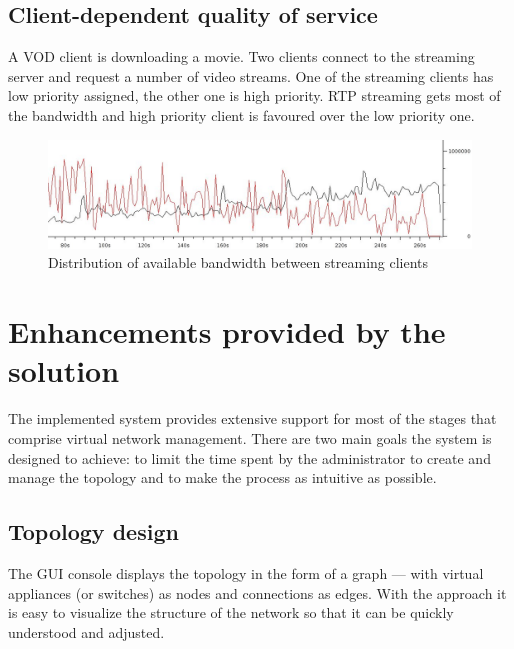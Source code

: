 \documentclass[11pt]{book}
\begin{document}
      \subsection{Client-dependent quality of service}
      \label{sub:uc:client}

        A VOD client is downloading a movie. Two clients connect to the streaming server and request a number of video
        streams. One of the streaming clients has low priority assigned, the other one is high priority. RTP streaming
        gets most of the bandwidth and high priority client is favoured over the low priority one.

        \begin{figure}[H]
          \begin{center}
            \includegraphics[width=.7\textwidth]{img/test-case/exp-stream-client.png}
          \end{center}

          \caption{Distribution of available bandwidth between streaming clients}
        \end{figure}


    \section{Enhancements provided by the solution}
    \label{sec:uc:enhance}

      The implemented system provides extensive support for most of the stages that comprise virtual network management.
      There are two main goals the system is designed to achieve: to limit the time spent by the administrator to create
      and manage the topology and to make the process as intuitive as possible.


      \subsection{Topology design}
      \label{sub:uc:enhance:design}

        The GUI console displays the topology in the form of a graph --- with virtual appliances (or switches) as nodes
        and connections as edges. With the approach it is easy to visualize the structure of the network so that it can
        be quickly understood and adjusted.
\end{document}
